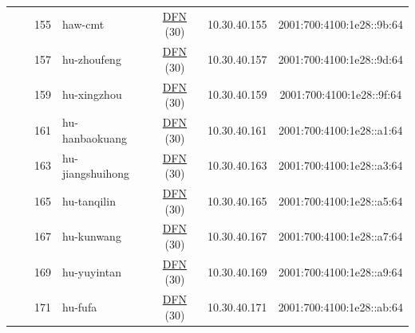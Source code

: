 \begin{small}
\begin{center}
\begin{longtable}{|c|c|c|c|c|c|c|c|}
  &  & \tiny{155} & \multicolumn{1}{|l|}{\tiny{haw-cmt}} & \multicolumn{2}{|c|}{\tiny{\href{https://www.dfn.de}{DFN} (30)}} & \tiny{10.30.40.155} & \tiny{2001:700:4100:1e28::9b:64} \\* \cline{3-3}\cline{4-4}\cline{5-5}\cline{6-6}\cline{7-7}\cline{8-8}
  &  & \tiny{157} & \multicolumn{1}{|l|}{\tiny{hu-zhoufeng}} & \multicolumn{2}{|c|}{\tiny{\href{https://www.dfn.de}{DFN} (30)}} & \tiny{10.30.40.157} & \tiny{2001:700:4100:1e28::9d:64} \\* \cline{3-3}\cline{4-4}\cline{5-5}\cline{6-6}\cline{7-7}\cline{8-8}
  &  & \tiny{159} & \multicolumn{1}{|l|}{\tiny{hu-xingzhou}} & \multicolumn{2}{|c|}{\tiny{\href{https://www.dfn.de}{DFN} (30)}} & \tiny{10.30.40.159} & \tiny{2001:700:4100:1e28::9f:64} \\* \cline{3-3}\cline{4-4}\cline{5-5}\cline{6-6}\cline{7-7}\cline{8-8}
  &  & \tiny{161} & \multicolumn{1}{|l|}{\tiny{hu-hanbaokuang}} & \multicolumn{2}{|c|}{\tiny{\href{https://www.dfn.de}{DFN} (30)}} & \tiny{10.30.40.161} & \tiny{2001:700:4100:1e28::a1:64} \\* \cline{3-3}\cline{4-4}\cline{5-5}\cline{6-6}\cline{7-7}\cline{8-8}
  &  & \tiny{163} & \multicolumn{1}{|l|}{\tiny{hu-jiangshuihong}} & \multicolumn{2}{|c|}{\tiny{\href{https://www.dfn.de}{DFN} (30)}} & \tiny{10.30.40.163} & \tiny{2001:700:4100:1e28::a3:64} \\* \cline{3-3}\cline{4-4}\cline{5-5}\cline{6-6}\cline{7-7}\cline{8-8}
  &  & \tiny{165} & \multicolumn{1}{|l|}{\tiny{hu-tanqilin}} & \multicolumn{2}{|c|}{\tiny{\href{https://www.dfn.de}{DFN} (30)}} & \tiny{10.30.40.165} & \tiny{2001:700:4100:1e28::a5:64} \\* \cline{3-3}\cline{4-4}\cline{5-5}\cline{6-6}\cline{7-7}\cline{8-8}
  &  & \tiny{167} & \multicolumn{1}{|l|}{\tiny{hu-kunwang}} & \multicolumn{2}{|c|}{\tiny{\href{https://www.dfn.de}{DFN} (30)}} & \tiny{10.30.40.167} & \tiny{2001:700:4100:1e28::a7:64} \\* \cline{3-3}\cline{4-4}\cline{5-5}\cline{6-6}\cline{7-7}\cline{8-8}
  &  & \tiny{169} & \multicolumn{1}{|l|}{\tiny{hu-yuyintan}} & \multicolumn{2}{|c|}{\tiny{\href{https://www.dfn.de}{DFN} (30)}} & \tiny{10.30.40.169} & \tiny{2001:700:4100:1e28::a9:64} \\* \cline{3-3}\cline{4-4}\cline{5-5}\cline{6-6}\cline{7-7}\cline{8-8}
  &  & \tiny{171} & \multicolumn{1}{|l|}{\tiny{hu-fufa}} & \multicolumn{2}{|c|}{\tiny{\href{https://www.dfn.de}{DFN} (30)}} & \tiny{10.30.40.171} & \tiny{2001:700:4100:1e28::ab:64} \\* \cline{3-3}\cline{4-4}\cline{5-5}\cline{6-6}\cline{7-7}\cline{8-8}

\end{longtable}
\end{center}
\end{small}
